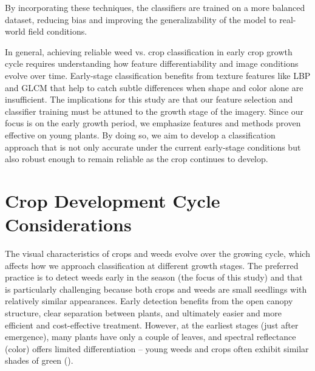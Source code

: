 \documentclass[letterpaper, notitlepage]{report}
\begin{document}
By incorporating these techniques, the classifiers are trained on a more balanced dataset, reducing bias and improving the generalizability of the model to real-world field conditions.

In general, achieving reliable weed vs. crop classification in early crop growth cycle requires understanding how feature differentiability and image conditions evolve over time. Early-stage classification benefits from texture features like LBP and GLCM that help to catch subtle differences when shape and color alone are insufficient. The implications for this study are that our feature selection and classifier training must be attuned to the growth stage of the imagery. Since our focus is on the early growth period, we emphasize features and methods proven effective on young plants. By doing so, we aim to develop a classification approach that is not only accurate under the current early-stage conditions but also robust enough to remain reliable as the crop continues to develop.

\section{Crop Development Cycle Considerations}

The visual characteristics of crops and weeds evolve over the growing cycle, which affects how we approach classification at different growth stages. The preferred practice is to detect weeds early in the season (the focus of this study) and that is particularly challenging because both crops and weeds are small seedlings with relatively similar appearances. Early detection benefits from the open canopy structure, clear separation between plants, and ultimately easier and more efficient and cost-effective treatment. However, at the earliest stages (just after emergence), many plants have only a couple of leaves, and spectral reflectance (color) offers limited differentiation – young weeds and crops often exhibit similar shades of green (\cite{Garibaldi-Marquez2022-yn}).
\end{document}
